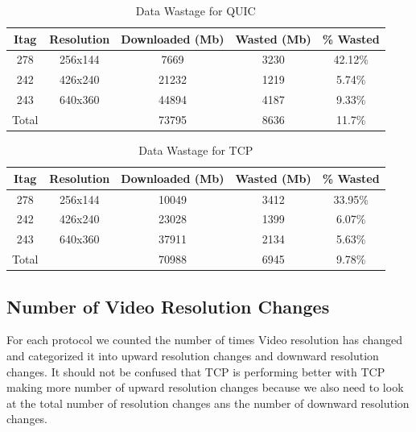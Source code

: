 \begin{table}[ht!]
\centering
\scriptsize
\begin{tabular}{||c |c |c|c|c||} 
 \hline
 \textbf{Itag} & \textbf{Resolution} & \textbf{Downloaded (Mb)}& \textbf{Wasted (Mb)}& \textbf{\% Wasted }  \\ [0.5ex] 
 \hline\hline
  278 & 256x144 & 7669 & 3230 & 42.12\%\\ 
 \hline
  242 & 426x240 & 21232 & 1219 &5.74\%\\ 
 \hline
  243 & 640x360 & 44894 & 4187 &9.33\%\\ 
  \hline
  \hline
  Total &  & 73795 & 8636 &11.7\%\\ 
 \hline
\end{tabular}
\caption{Data Wastage for QUIC}
\label{table:3}
\end{table}

\begin{table}[ht!]
\centering
\scriptsize
\begin{tabular}{||c |c |c|c|c||} 
 \hline
 \textbf{Itag} & \textbf{Resolution} & \textbf{Downloaded (Mb)}& \textbf{Wasted (Mb)}& \textbf{\% Wasted }  \\ [0.5ex] 
 \hline\hline
  278 & 256x144 & 10049 & 3412 & 33.95\%\\ 
 \hline
  242 & 426x240 & 23028 & 1399 &6.07\%\\ 
 \hline
  243 & 640x360 & 37911 & 2134 &5.63\%\\ 
  \hline
  \hline
  Total &  & 70988 & 6945 &9.78\%\\ 
 \hline
\end{tabular}
\caption{Data Wastage for TCP}
\label{table:4}
\end{table}

\subsection{Number of Video Resolution Changes}
For each protocol we counted the number of times Video resolution has changed and categorized it into upward resolution changes and downward resolution changes. It should not be confused that TCP is performing better with TCP making more number of upward resolution changes because we also need to look at the total number of resolution changes ans the number of downward resolution changes. 

